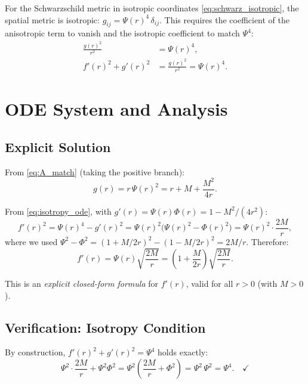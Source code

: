 \documentclass[11pt,a4paper]{article}
\theoremstyle{definition}
\theoremstyle{remark}
\begin{document}
For the Schwarzschild metric in isotropic coordinates \eqref{eq:schwarz_isotropic},
the spatial metric is isotropic: $g_{ij} = \Psi(r)^4\,\delta_{ij}$.  This
requires the coefficient of the anisotropic term to vanish and the isotropic
coefficient to match $\Psi^4$:
\begin{align}
  \frac{g(r)^2}{r^2} &= \Psi(r)^4,
  \label{eq:A_match}\\
  f'(r)^2 + g'(r)^2 &= \frac{g(r)^2}{r^2} = \Psi(r)^4.
  \label{eq:isotropy_ode}
\end{align}

\section{ODE System and Analysis}
\label{sec:odes}

\subsection{Explicit Solution}

From \eqref{eq:A_match} (taking the positive branch):
\begin{equation}
  g(r) = r\,\Psi(r)^2 = r + M + \frac{M^2}{4r}.
  \label{eq:g_solution}
\end{equation}

From \eqref{eq:isotropy_ode}, with $g'(r) = \Psi(r)\Phi(r) = 1 - M^2/(4r^2)$:
\begin{equation}
  f'(r)^2 = \Psi(r)^4 - g'(r)^2
  = \Psi(r)^2\bigl(\Psi(r)^2 - \Phi(r)^2\bigr)
  = \Psi(r)^2 \cdot \frac{2M}{r},
  \label{eq:fprime_squared}
\end{equation}
where we used $\Psi^2 - \Phi^2 = (1+M/2r)^2 - (1-M/2r)^2 = 2M/r$.
Therefore:
\begin{equation}
  f'(r) = \Psi(r)\sqrt{\frac{2M}{r}}
  = \left(1 + \frac{M}{2r}\right)\sqrt{\frac{2M}{r}}.
  \label{eq:fprime_solution}
\end{equation}

This is an \emph{explicit closed-form formula} for $f'(r)$, valid for all
$r > 0$ (with $M > 0$).

\subsection{Verification: Isotropy Condition}

By construction, $f'(r)^2 + g'(r)^2 = \Psi^4$ holds exactly:
\begin{equation}
  \Psi^2 \cdot \frac{2M}{r} + \Psi^2\Phi^2
  = \Psi^2\left(\frac{2M}{r} + \Phi^2\right)
  = \Psi^2\,\Psi^2 = \Psi^4. \quad\checkmark
\end{equation}
\end{document}
